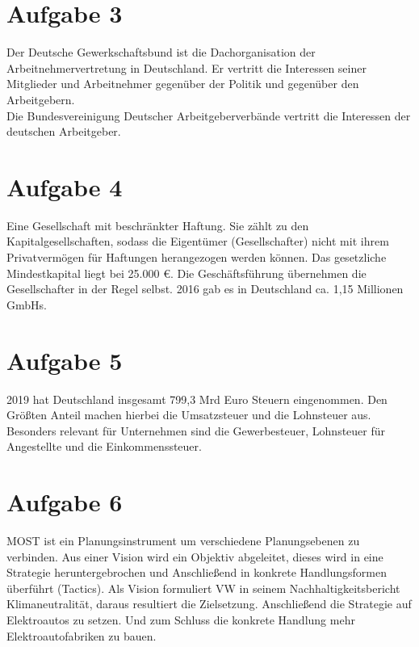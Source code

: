 \documentclass{article}
\begin{document}
	\section*{Aufgabe 3}
	
	Der Deutsche Gewerkschaftsbund ist die Dachorganisation der Arbeitnehmervertretung in Deutschland. Er vertritt die Interessen seiner Mitglieder und Arbeitnehmer gegenüber der Politik und gegenüber den Arbeitgebern. \\
	Die Bundesvereinigung Deutscher Arbeitgeberverbände vertritt die Interessen der deutschen Arbeitgeber. 
	
	\section*{Aufgabe 4}
	Eine Gesellschaft mit beschränkter Haftung. Sie zählt zu den Kapitalgesellschaften, sodass die Eigentümer (Gesellschafter) nicht mit ihrem Privatvermögen für Haftungen herangezogen werden können. Das gesetzliche Mindestkapital liegt bei 25.000 €. Die Geschäftsführung übernehmen die Gesellschafter in der Regel selbst. 2016 gab es in Deutschland ca. 1,15 Millionen GmbHs.
	\section*{Aufgabe 5}
	2019 hat Deutschland insgesamt 799,3 Mrd Euro Steuern eingenommen. Den Größten Anteil machen hierbei die Umsatzsteuer und die Lohnsteuer aus. Besonders relevant für Unternehmen sind die Gewerbesteuer, Lohnsteuer für Angestellte und die Einkommenssteuer.
	\section*{Aufgabe 6}
	MOST ist ein Planungsinstrument um verschiedene Planungsebenen zu verbinden. Aus einer Vision wird ein Objektiv abgeleitet, dieses wird in eine Strategie heruntergebrochen und Anschließend in konkrete Handlungsformen überführt (Tactics). Als Vision formuliert VW in seinem Nachhaltigkeitsbericht Klimaneutralität, daraus resultiert die Zielsetzung. Anschließend die Strategie auf Elektroautos zu setzen. Und zum Schluss die konkrete Handlung mehr Elektroautofabriken zu bauen. 
\end{document}
